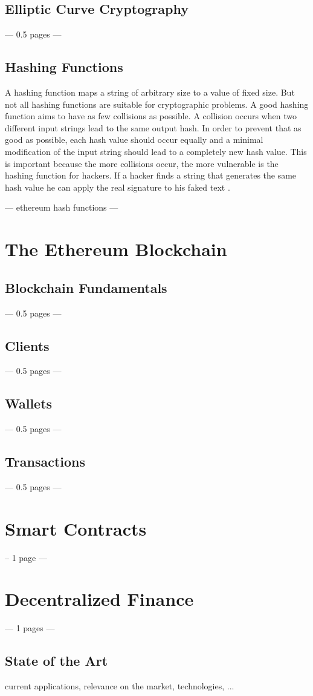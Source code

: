 \subsection{Elliptic Curve Cryptography}
--- 0.5 pages ---
\subsection{Hashing Functions}
A hashing function maps a string of arbitrary size to a value of fixed size. But not all hashing functions are suitable for cryptographic problems. A good hashing function aims to have as few collisions as possible. A collision occurs when two different input strings lead to the same output hash. In order to prevent that as good as possible, each hash value should occur equally and a minimal modification of the input string should lead to a completely new hash value. This is important because the more collisions occur, the more vulnerable is the hashing function for hackers. If a hacker finds a string that generates the same hash value he can apply the real signature to his faked text \cite{Schmeh2007}.

--- ethereum hash functions --- 

\section{The Ethereum Blockchain}
\subsection{Blockchain Fundamentals}
--- 0.5 pages ---
\subsection{Clients}
--- 0.5 pages ---
\subsection{Wallets}
--- 0.5 pages ---
\subsection{Transactions}
--- 0.5 pages ---
\section{Smart Contracts}
-- 1 page ---
\section{Decentralized Finance}
--- 1 pages ---
\subsection{State of the Art}
current applications, relevance on the market, technologies, ...